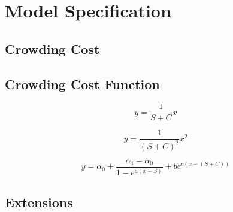 \chapter{Model Specification}
\label{chap:ModelSpec}

\section{Crowding Cost}

\section{Crowding Cost Function}

\begin{equation}
    \label{eqn:linear}
    y=\frac{1}{S+C}x
\end{equation}

\begin{equation}
    \label{eqn:quadratic}
    y=\frac{1}{(S+C)^2}x^2
\end{equation}

\begin{equation}
    \label{eqn:stepped}
    y=\alpha_0+\frac{\alpha_1-\alpha_0}{1-e^{a(x-S)}}+be^{c(x-(S+C))}
\end{equation}

\section{Extensions}